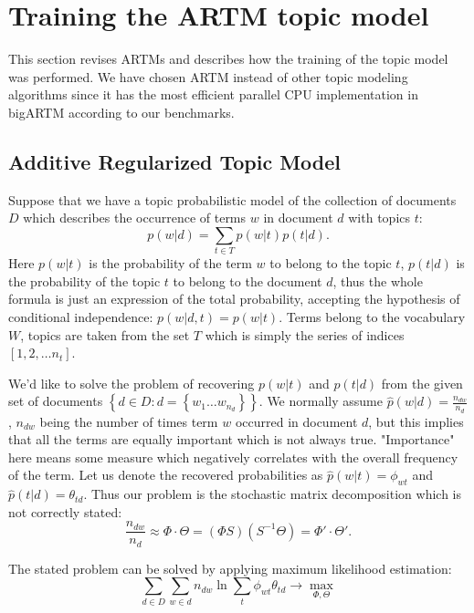 \documentclass[conference,10pt]{IEEEtran}
\begin{document}
\section{Training the ARTM topic model}
This section revises ARTMs and describes how the training of the topic model was performed. We have chosen ARTM instead of other topic modeling algorithms since it has the most efficient parallel CPU implementation in bigARTM according to our benchmarks.
\subsection{Additive Regularized Topic Model} 
Suppose that we have a topic probabilistic model of the collection of documents
$D$ which describes the occurrence of terms $w$ in document $d$ with topics $t$:
\begin{equation}
p(w|d) = \sum_{t\in T} p(w|t) p(t|d).
\end{equation}
Here $p(w|t)$ is the probability of the term $w$ to belong to the topic $t$,
$p(t|d)$ is the probability of the topic $t$ to belong to the document $d$,
thus the whole formula is just an expression of the total probability,
accepting the hypothesis of conditional independence: $p(w|d,t) = p(w|t)$.
Terms belong to the vocabulary $W$, topics are taken from the set $T$ which is simply the series of indices $[1, 2, \dots n_t]$.

We'd like to solve the problem of recovering $p(w|t)$ and $p(t|d)$ from
the given set of documents $\left\{d\in D: d = \left\{w_1 \dots w_{n_d}\right\}\right\}$.
We normally assume $\hat{p}(w|d) = \frac{n_{dw}}{n_d}$, $n_{dw}$
being the number of times term $w$ occurred in document $d$,
but this implies that all the terms are equally important which is not always true.
"Importance" here means some measure which negatively correlates with the overall frequency of the term.
Let us denote the recovered probabilities as $\hat{p}(w|t) = \phi_{wt}$ and $\hat{p}(t|d) = \theta_{td}$.
Thus our problem is the stochastic matrix decomposition which is not correctly stated:
\begin{equation}
\frac{n_{dw}}{n_d} \approx \Phi \cdot \Theta = (\Phi S)(S^{-1}\Theta) = \Phi' \cdot \Theta'.
\end{equation}

The stated problem can be solved by applying maximum likelihood estimation:
\begin{equation}
\sum_{d\in D}\sum_{w\in d}n_{dw}\ln \sum_{t}\phi_{wt} \theta_{td} \to \max_{\Phi,\Theta}
\end{equation}
\end{document}
